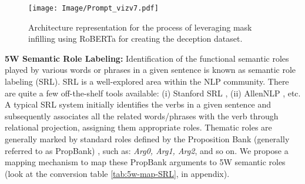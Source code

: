 \vspace{-1mm}
\begin{figure}[!tbh]
\vspace{-1mm}
\centering
\texttt{[image: Image/Prompt\_vizv7.pdf]}
\vspace{-6mm}
\caption{Architecture representation for the process of leveraging mask infilling using RoBERTa \cite{liu2019roberta} for creating the deception dataset.}
\label{fig: architecture_MaskInfilling}
\vspace{-2.5mm}
\end{figure}

\noindent
\textbf{5W Semantic Role Labeling:}
Identification of the functional semantic roles played by various words or phrases in a given sentence is known as semantic role labeling (SRL). SRL is a well-explored area within the NLP community. There are quite a few off-the-shelf tools available: (i) Stanford SRL \cite{manning2014stanford}, (ii) AllenNLP \cite{allennlpsrl}, etc. A typical SRL system initially identifies the verbs in a given sentence and subsequently associates all the related words/phrases with the verb through relational projection, assigning them appropriate roles. Thematic roles are generally marked by standard roles defined by the Proposition Bank (generally referred to as PropBank) \cite{palmer2005proposition}, such as: \textit{Arg0, Arg1, Arg2}, and so on. We propose a mapping mechanism to map these PropBank arguments to 5W semantic roles (look at the conversion table \ref{tab:5w-map-SRL}, in appendix).


\begin{comment}
Semantic role labelling (SRL) is a natural language processing technique that involves identifying the functions of different words or phrases in a sentence. This helps to determine the meaning of the sentence by revealing the relationships between the entities in the sentence. For example, in the sentence "\textit{Moderna’s lawsuits against Pfizer-BioNTech show COVID-19 vaccines were in the works before the pandemic started,}" \textit{Moderna} would be labeled as the \textit{agent} and \textit{Pfizer-BioNTech} would be labelled as the \textit{patient}.


Using the generated paraphrases, we identify 5Ws(Who, What, When, Where, Why) using the mapping between Semantic Role Labels and 5Ws as explained by \cite{rani2023factify5wqa} \cite{}. A typical SRL system first identifies verbs in a given sentence  and then marks all the related words/phrases haven relational projection with the verb and assigns appropriate roles. Thematic roles are generally marked by standard roles defined by the Proposition Bank (generally referred to as PropBank) \cite{palmer2005proposition}, such as: \textit{Arg0, Arg1, Arg2}, and so on. A mapping mechanism to map these PropBank arguments to 5W semantic roles is described in the conversion table \ref{tab:5w-map-SRL}.
\end{comment}



